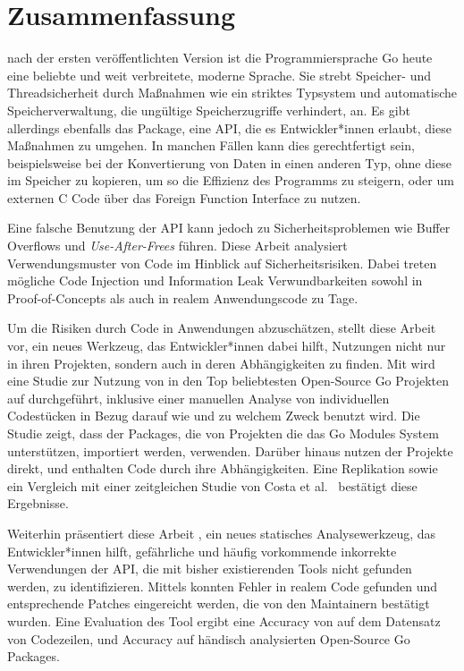 \chapter*{Zusammenfassung}

 nach der ersten veröffentlichten Version ist die Programmiersprache Go heute eine beliebte und
weit verbreitete, moderne Sprache.
Sie strebt Speicher- und Threadsicherheit durch Maßnahmen wie ein striktes Typsystem und automatische
Speicherverwaltung, die ungültige Speicherzugriffe verhindert, an.
Es gibt allerdings ebenfalls das \unsafe{} Package, eine API, die es Entwickler*innen erlaubt, diese
Maßnahmen zu umgehen.
In manchen Fällen kann dies gerechtfertigt sein, beispielsweise bei der Konvertierung von Daten in einen anderen Typ,
ohne diese im Speicher zu kopieren, um so die Effizienz des Programms zu steigern, oder um externen C Code über das
Foreign Function Interface zu nutzen.

Eine falsche Benutzung der \unsafe{} API kann jedoch zu Sicherheitsproblemen wie Buffer Overflows und
\textit{Use-After-Frees} führen.
Diese Arbeit analysiert Verwendungsmuster von \unsafe{} Code im Hinblick auf Sicherheitsrisiken.
Dabei treten mögliche Code Injection und Information Leak Verwundbarkeiten sowohl in Proof-of-Concepts als auch in
realem Anwendungscode zu Tage.

Um die Risiken durch \unsafe{} Code in Anwendungen abzuschätzen, stellt diese Arbeit \toolGeiger{} vor, ein neues
Werkzeug, das Entwickler*innen dabei hilft, \unsafe{} Nutzungen nicht nur in ihren Projekten, sondern auch in deren
Abhängigkeiten zu finden.
Mit \toolGeiger{} wird eine Studie zur Nutzung von \unsafe{} in den Top \projsTotal{} beliebtesten Open-Source Go
Projekten auf \github{} durchgeführt, inklusive einer manuellen Analyse von \numberLabeledCodeSnippets{} individuellen
Codestücken in Bezug darauf wie und zu welchem Zweck \unsafe{} benutzt wird.
Die Studie zeigt, dass \percentageUnsafePackages{} der Packages, die von Projekten die das Go Modules System
unterstützen, importiert werden, \unsafe{} verwenden.
Darüber hinaus nutzen \percentageUnsafeProjects{} der Projekte \unsafe{} direkt, und
\percentageUnsafeTransitiveWithDependencies{} enthalten \unsafe{} Code durch ihre Abhängigkeiten.
Eine Replikation sowie ein Vergleich mit einer zeitgleichen Studie von Costa et al.~\cite{costa2020} bestätigt diese
Ergebnisse.

Weiterhin präsentiert diese Arbeit \toolSafer{}, ein neues statisches Analysewerkzeug, das Entwickler*innen hilft,
 gefährliche und häufig vorkommende inkorrekte Verwendungen der \unsafe{} \acrshort{API}, die mit bisher
existierenden Tools nicht gefunden werden, zu identifizieren.
Mittels \toolSafer{} konnten \numberBugsFixed{} Fehler in realem Code gefunden und entsprechende Patches eingereicht
werden, die von den Maintainern bestätigt wurden.
Eine Evaluation des Tool ergibt eine Accuracy von \goSaferEvaluationDatasetGosaferAccuracy{} auf dem Datensatz von
\unsafe{} Codezeilen, und \goSaferEvaluationPackagesGosaferAccuracy{} Accuracy auf händisch analysierten Open-Source
Go Packages.
